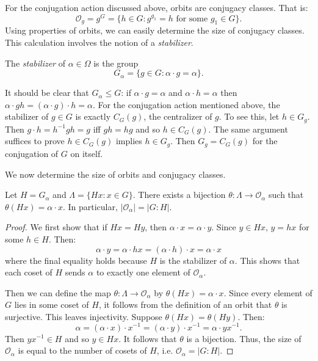 \documentclass[main.tex]{subfiles}
\begin{document}
For the conjugation action discussed above, orbits are conjugacy classes. That is:
$$\mathcal{O}_g = g^G = \{h \in G : g^{g_1} = h \text{ for some } g_1 \in G \} \text{.}$$
 Using properties of orbits, we can easily determine the size of conjugacy classes. This calculation involves the notion of a \emph{stabilizer}.

\hss

\begin{definition}
The \emph{stabilizer} of $\alpha \in \Omega$ is the group 
$$G_\alpha = \{g \in G : \alpha \cdot g = \alpha \} \text{.}$$
\end{definition}

\hss

It should be clear that $G_\alpha \le G$: if $\alpha \cdot g = \alpha$ and $\alpha \cdot h = \alpha$ then $\alpha \cdot gh = (\alpha \cdot g) \cdot h = \alpha$. For the conjugation action mentioned above, the stabilizer of $g \in G$ is exactly $C_G(g)$, the centralizer of $g$. To see this, let $h \in G_g$. Then $g \cdot h = h^{-1} g h = g$ iff $gh = hg$ and so $h \in C_G(g)$. The same argument suffices to prove $h \in C_G(g)$ implies $h \in G_g$. Then $G_g = C_G(g)$ for the conjugation of $G$ on itself.

We now determine the size of orbits and conjugacy classes.

\begin{theorem}
Let $H = G_\alpha$ and $\Lambda = \{H x : x \in G\}$. There exists a bijection $\theta : \Lambda \to \mathcal{O}_\alpha$ such that $\theta(H x) = \alpha \cdot x$. In particular,
$|\mathcal{O}_\alpha| = |G : H|$.
\end{theorem}

\begin{proof}
We first show that if $H x = H y$, then $\alpha \cdot x = \alpha \cdot y$. Since $y \in Hx$, $y = h x$ for some $h \in H$. Then:
$$\alpha \cdot y = \alpha \cdot h x = (\alpha \cdot h) \cdot x = \alpha \cdot x$$
where the final equality holds because $H$ is the stabilizer of $\alpha$. This shows that each coset of $H$ sends $\alpha$ to exactly one element of $\mathcal{O}_\alpha$.

Then we can define the map $\theta: \Lambda \to \mathcal{O}_\alpha$ by $\theta(H x) = \alpha \cdot x$. Since every element of $G$ lies in some coset of $H$, it follows from the definition of an orbit that $\theta$ is surjective. This leaves injectivity. Suppose $\theta(H x) = \theta(H y)$. Then:
$$ \alpha = (\alpha \cdot x ) \cdot x^{-1} = (\alpha \cdot y) \cdot x^{-1} = \alpha \cdot y x^{-1} \text{.}$$
Then $y x^{-1} \in H$ and so $y \in Hx$. It follows that $\theta$ is a bijection. Thus, the size of $\mathcal{O}_\alpha$ is equal to the number of cosets of $H$, i.e. $\mathcal{O}_\alpha = |G : H|$.

\end{proof}
\end{document}
